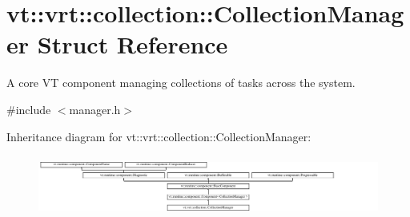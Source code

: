 \hypertarget{structvt_1_1vrt_1_1collection_1_1_collection_manager}{}\section{vt\+:\+:vrt\+:\+:collection\+:\+:Collection\+Manager Struct Reference}
\label{structvt_1_1vrt_1_1collection_1_1_collection_manager}


A core VT component managing collections of tasks across the system.  




{\ttfamily \#include $<$manager.\+h$>$}

Inheritance diagram for vt\+:\+:vrt\+:\+:collection\+:\+:Collection\+Manager\+:\begin{figure}[H]
\begin{center}
\leavevmode
\includegraphics[height=2.034884cm]{structvt_1_1vrt_1_1collection_1_1_collection_manager}
\end{center}
\end{figure}
